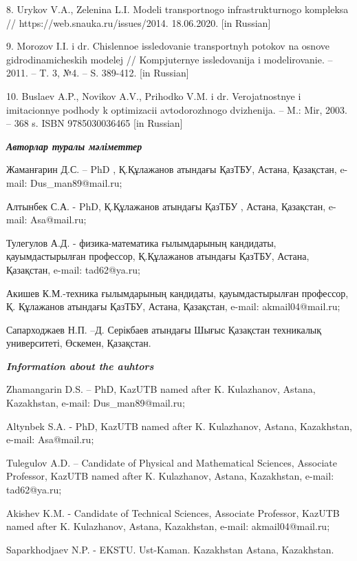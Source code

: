 8. Urykov V.A., Zelenina L.I. Modeli transportnogo infrastrukturnogo
kompleksa // https://web.snauka.ru/issues/2014. 18.06.2020. {[}in
Russian{]}

9. Morozov I.I. i dr. Chislennoe issledovanie transportnyh potokov na
osnove gidrodinamicheskih modelej // Komp\textquotesingle juternye
issledovanija i modelirovanie. -- 2011. -- T. 3, №4. -- S. 389-412.
{[}in Russian{]}

10. Buslaev A.P., Novikov A.V., Prihod\textquotesingle ko V.M. i dr.
Verojatnostnye i imitacionnye podhody k optimizacii avtodorozhnogo
dvizhenija. -- M.: Mir, 2003. -- 368 s. ISBN 9785030036465 {[}in
Russian{]}

\emph{{\bfseries Авторлар туралы мәліметтер}}

Жаманғарин Д.С. -- PhD , Қ.Құлажанов атындағы ҚазТБУ, Астана, Қазақстан,
e-mail: Dus\_man89@mail.ru;

Алтынбек С.А. - PhD, Қ.Құлажанов атындағы ҚазТБУ , Астана, Қазақстан,
e-mail: Asa@mail.ru;

Тулегулов А.Д. - физика-математика ғылымдарының кандидаты,
қауымдастырылған профессор, Қ.Құлажанов атындағы ҚазТБУ, Астана,
Қазақстан, e-mail: tad62@ya.ru;

Акишев К.М.-техника ғылымдарының кандидаты, қауымдастырылған профессор,
Қ. Құлажанов атындағы ҚазТБУ, Астана, Қазақстан, e-mail:
akmail04@mail.ru;

Сапарходжаев Н.П. --Д. Серікбаев атындағы Шығыс Қазақстан техникалық
университеті, Өскемен, Қазақстан.

\emph{{\bfseries Information about the auhtors}}

Zhamangarin D.S. -- PhD, KazUTB named after K. Kulazhanov, Astana,
Kazakhstan, e-mail: Dus\_man89@mail.ru;

Altynbek S.A. - PhD, KazUTB named after K. Kulazhanov, Astana,
Kazakhstan, e-mail: Asa@mail.ru;

Tulegulov A.D. -- Candidate of Physical and Mathematical Sciences,
Associate Professor, KazUTB named after K. Kulazhanov, Astana,
Kazakhstan, e-mail: tad62@ya.ru;

Akishev K.M. - Candidate of Technical Sciences, Associate Professor,
KazUTB named after K. Kulazhanov, Astana, Kazakhstan, e-mail:
akmail04@mail.ru;

Saparkhodjaev N.P. - EKSTU. Ust-Kaman. Kazakhstan Astana, Kazakhstan.


